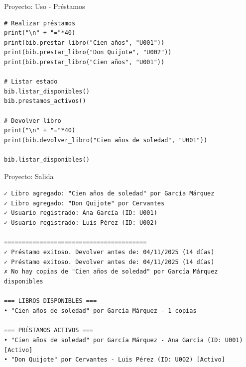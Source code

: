 \documentclass{beamer}
\begin{document}
\begin{frame}[fragile]{Proyecto: Uso - Préstamos \faHandshake}
\begin{lstlisting}
# Realizar préstamos
print("\n" + "="*40)
print(bib.prestar_libro("Cien años", "U001"))
print(bib.prestar_libro("Don Quijote", "U002"))
print(bib.prestar_libro("Cien años", "U001"))

# Listar estado
bib.listar_disponibles()
bib.prestamos_activos()

# Devolver libro
print("\n" + "="*40)
print(bib.devolver_libro("Cien años de soledad", "U001"))

bib.listar_disponibles()
\end{lstlisting}
\end{frame}

\begin{frame}[fragile]{Proyecto: Salida \faArrowCircleRight}
\begin{tcolorbox}[colback=green!10,colframe=green,title={\small\faArrowCircleRight \ Salida},coltitle=fg0,left=3pt,right=3pt,top=2pt,bottom=2pt,boxsep=1pt]
\tiny\texttt{✓ Libro agregado: "Cien años de soledad" por García Márquez\\
✓ Libro agregado: "Don Quijote" por Cervantes\\
✓ Usuario registrado: Ana García (ID: U001)\\
✓ Usuario registrado: Luis Pérez (ID: U002)\\
\ \\
========================================\\
✓ Préstamo exitoso. Devolver antes de: 04/11/2025 (14 días)\\
✓ Préstamo exitoso. Devolver antes de: 04/11/2025 (14 días)\\
✗ No hay copias de "Cien años de soledad" por García Márquez disponibles\\
\ \\
=== LIBROS DISPONIBLES ===\\
• "Cien años de soledad" por García Márquez - 1 copias\\
\ \\
=== PRÉSTAMOS ACTIVOS ===\\
• "Cien años de soledad" por García Márquez - Ana García (ID: U001) [Activo]\\
• "Don Quijote" por Cervantes - Luis Pérez (ID: U002) [Activo]}
\end{tcolorbox}
\end{frame}
\end{document}
